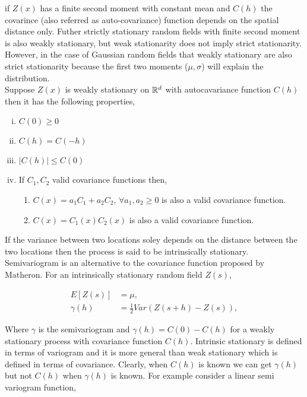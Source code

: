 if $Z(x)$ has a finite second moment with constant mean and $C(h)$ the covarince (also referred as auto-covariance) function depends on the spatial distance only. Futher strictly stationary random fields with finite second moment is also weakly stationary, but weak stationarity does not imply strict stationarity. However, in the case of Gaussian random fields that weakly stationary are also strict stationarity because the first two moments ($\mu, \sigma$) will explain the distribution. \\

Suppose $Z(x)$ is weakly stationary on $\mathbb{R}^d$ with autocavariance function $C(h)$ then it has the following properties,

\begin{enumerate}[(i)]
	\item $C(0) \ge 0$
	\item $C(h) = C(-h)$
	\item $|C(h)| \le  C(0)$
	\item If $C_1, C_2$ valid covariance functions then,
	      
	      \begin{enumerate}
	      	\item $C(x) = a_1C_1+a_2C_2$, $\forall a_1,a_2\ge 0$ is also a valid covariance function.
	      	\item $C(x) = C_1(x)C_2(x)$ is also a valid covariance function.
	      \end{enumerate}
	      
\end{enumerate}


If the variance between two locations soley depends on the distance between the two locations then the process is said to be intrinsically stationary. Semivariogram is an alternative to the covariance function proposed by Matheron. For an intrinsically stationary random field $Z(s)$,

\begin{align}
	E[Z(s)]   & = \mu , \nonumber                \\
	\gamma(h) & = \frac{1}{2} Var(Z(s+h) -Z(s)), 
\end{align}

Where $\gamma$ is the semivariogram and $\gamma(h) = C(0) - C(h)$ for a weakly stationary process with covariance function $C(h)$. Intrinsic stationary is defined in terms of variogram and it is more general than weak stationary which is defined in terms of covariance. Clearly, when $C(h)$ is known we can get $\gamma(h)$ but not $C(h)$ when $\gamma(h)$ is known. For example consider a linear semi variogram function,

